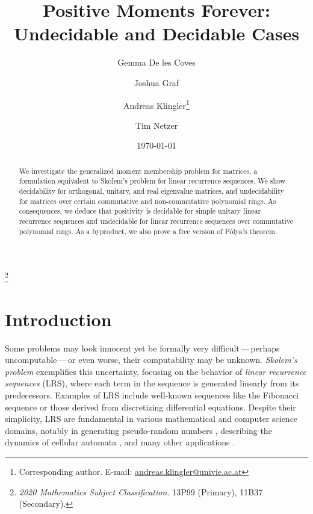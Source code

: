\documentclass[11pt]{article}
\theoremstyle{definition}
\newcommand\blfootnote[1]{%
  \begingroup
  \renewcommand\thefootnote{}\footnote{#1}%
  \addtocounter{footnote}{-1}%
  \endgroup
}
\providecommand{\subjclass}[1]{\blfootnote{\textit{2020 Mathematics Subject Classification.} #1}}
\begin{document}
\title{Positive Moments Forever:\\ Undecidable and Decidable Cases}
\author[1]{Gemma De les Coves}
\author[1]{Joshua Graf}
\author[1,2]{Andreas Klingler\thanks{Corresponding author. E-mail: \href{mailto:andreas.klingler@univie.ac.at}{andreas.klingler@univie.ac.at}}}
\author[3]{Tim Netzer}

\renewcommand\Affilfont{\itshape\small}

\date{\today}

\pagestyle{fancy}
\renewcommand{\headrulewidth}{0.1pt}
\fancyhf{}
\makeatletter
\newcommand{\runtitle}{Moment problems}
\makeatother
\fancyhead[OL]{\nouppercase\leftmark}
\fancyhead[ER]{\textsc\runtitle}
\fancyhead[EL,OR]{\thepage}
\maketitle



\begin{abstract}
We investigate the generalized moment membership problem for matrices, a formulation equivalent to Skolem’s problem for linear recurrence sequences. We show decidability for orthogonal, unitary, and real eigenvalue matrices, and undecidability for matrices over certain commutative and non-commutative polynomial rings. As consequences, we deduce that positivity is decidable for simple unitary linear recurrence sequences and undecidable for linear recurrence sequences over commutative polynomial rings. As a byproduct, we also prove a free version of Pólya’s theorem.
\end{abstract}


\subjclass{13P99 (Primary), 11B37 (Secondary).}

\section{Introduction}
Some problems may look innocent yet be formally very difficult\,---\,perhaps uncomputable\,---\,or even worse, their computability may be unknown. 
\emph{Skolem's problem} exemplifies this uncertainty, focusing on the behavior of \emph{linear recurrence sequences} (LRS), where each term in the sequence is generated linearly from its predecessors. Examples of LRS include well-known sequences like the Fibonacci sequence or those derived from discretizing differential equations. Despite their simplicity, LRS are fundamental in various mathematical and computer science domains, notably in generating pseudo-random numbers \cite{Ta65}, describing the dynamics of cellular automata \cite{Ma84}, and many other applications \cite{Ev03}.
\end{document}

